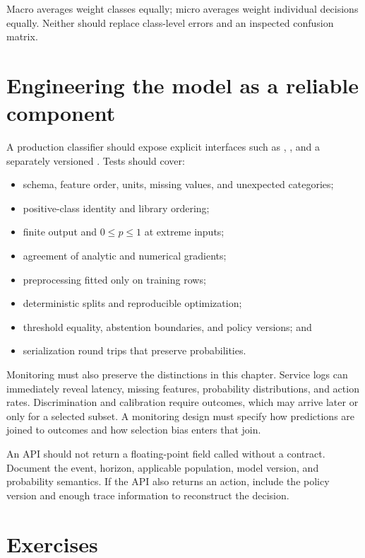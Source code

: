 Macro averages weight classes equally; micro averages weight individual
decisions equally. Neither should replace class-level errors and an inspected
confusion matrix.

\section{Engineering the model as a reliable component}

A production classifier should expose explicit interfaces such as
, , and a separately versioned
. Tests should cover:
\begin{itemize}
  \item schema, feature order, units, missing values, and unexpected categories;
  \item positive-class identity and library  ordering;
  \item finite output and $0\le p\le1$ at extreme inputs;
  \item agreement of analytic and numerical gradients;
  \item preprocessing fitted only on training rows;
  \item deterministic splits and reproducible optimization;
  \item threshold equality, abstention boundaries, and policy versions; and
  \item serialization round trips that preserve probabilities.
\end{itemize}

Monitoring must also preserve the distinctions in this chapter. Service logs
can immediately reveal latency, missing features, probability distributions,
and action rates. Discrimination and calibration require outcomes, which may
arrive later or only for a selected subset. A monitoring design must specify how
predictions are joined to outcomes and how selection bias enters that join.

\begin{professionalbox}
An API should not return a floating-point field called  without a
contract. Document the event, horizon, applicable population, model version,
and probability semantics. If the API also returns an action, include the
policy version and enough trace information to reconstruct the decision.
\end{professionalbox}

\section{Exercises}

